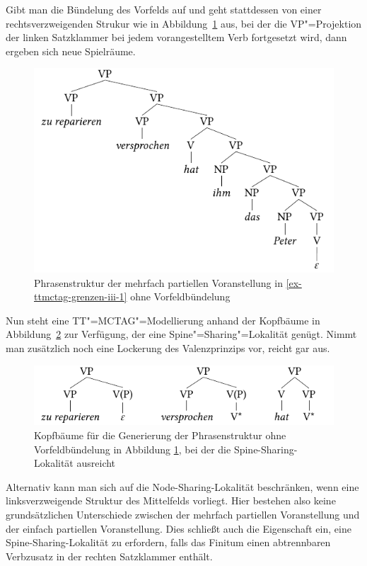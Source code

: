 Gibt man die Bündelung des Vorfelds auf und geht stattdessen von einer rechtsverzweigenden Strukur wie in Abbildung~\ref{fig-ttmctag-grenzen-iii-4} aus, bei der die VP"=Projektion der linken Satzklammer bei jedem vorangestelltem Verb fortgesetzt wird, dann ergeben sich neue Spielräume. 
\begin{figure}[t]
\centering
\includegraphics{graphics/abb739.pdf}
\caption{\label{fig-ttmctag-grenzen-iii-4}Phrasenstruktur der mehrfach partiellen Voranstellung in \ref{ex-ttmctag-grenzen-iii-1} ohne Vor\-feld\-bündelung}
\end{figure} 
Nun steht eine TT"=MCTAG"=Modellierung anhand der Kopfbäume in Abbildung~\ref{fig-ttmctag-grenzen-iii-5} zur Verfügung, der eine Spine"=Sharing"=Lokalität genügt. Nimmt man zusätzlich noch eine Lockerung des Valenzprinzips vor, reicht gar  aus. 
\begin{figure}[t]
\centering
\includegraphics{graphics/abb740.pdf}
\caption{\label{fig-ttmctag-grenzen-iii-5}Kopfbäume für die Generierung der Phrasenstruktur ohne Vorfeldbündelung in Abbildung \ref{fig-ttmctag-grenzen-iii-4}, bei der die Spine-Sharing-Lokalität ausreicht}
\end{figure}
Alternativ kann man sich auf die Node-Sharing-Lokalität beschränken, wenn eine linksverzweigende Struktur des Mittelfelds vorliegt. Hier bestehen also keine grundsätzlichen Unterschiede zwischen der mehrfach partiellen Voranstellung und der einfach partiellen Voranstellung. Dies schlie\ss t auch die Eigenschaft ein, eine Spine-Sharing-Lokalität zu erfordern, falls das Finitum einen abtrennbaren Verbzusatz in der rechten Satzklammer enthält.




